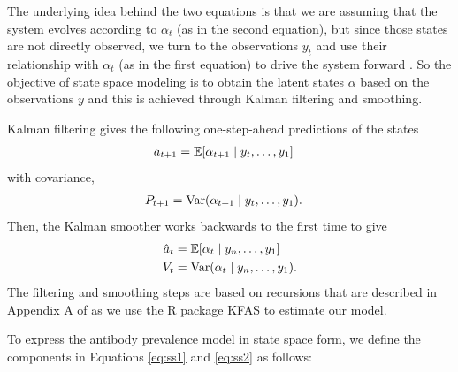 \documentclass{article}
\begin{document}
The underlying idea behind the two equations is that we are assuming that the
system evolves according to $\alpha_t$ (as in the second equation), 
but since those states are
not directly observed, we turn to the observations $y_t$ and use their
relationship with $\alpha_t$ (as in the first equation) to drive the system
forward \citep{durbin2012time}. So the objective of state space modeling is to
obtain the latent states $\alpha$ based on the observations $y$ and this is
achieved through Kalman filtering and smoothing. 

Kalman filtering gives the following one-step-ahead predictions of the states
\begin{align*}
a_{t+1} &= \mathbb{E}[\alpha_{t+1}\mid y_t, \dots, y_1] 
\end{align*} with covariance,
\begin{align*}
P_{t+1} &= \operatorname{Var}(\alpha_{t+1} \mid y_t, \dots, y_1).
\end{align*}
Then, the Kalman smoother works backwards to the first time to give
\begin{align}
\hat{a}_t &= \mathbb{E}[\alpha_{t}\mid y_n, \dots, y_1] \label{eq:hatat}\\
V_t &= \operatorname{Var}(\alpha_{t}\mid y_n, \dots, y_1). \label{eq:Vt}
\end{align}
The filtering and smoothing steps are based on recursions that are described in
Appendix A of \citet{helske2017kfas} as we use the R package KFAS to estimate
our model.


To express the antibody prevalence model in state space form, we define
 the components in Equations \ref{eq:ss1} and \ref{eq:ss2} as follows:
\end{document}
